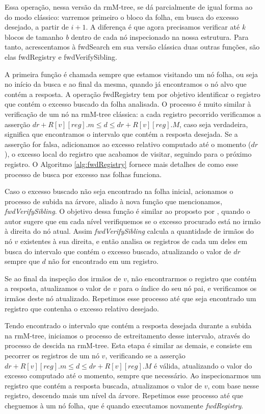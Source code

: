 Essa operação, nessa versão da rmM-tree, se dá parcialmente de igual forma ao do modo clássico: varremos primeiro o bloco da folha, em busca do excesso desejado, a partir de $i+1$.  A diferença é que agora precisamos verificar  até \textit{k} blocos de tamanho \textit{b} dentro de cada nó inspecionado na nossa estrutura. Para tanto, acrescentamos à fwdSearch em sua versão clássica duas outras funções, são elas fwdRegistry e fwdVerifySibling.

A primeira função é chamada sempre que estamos visitando um nó folha, ou seja no início da busca e ao final da mesma, quando já encontramos o nó alvo que contém a resposta.  A operação fwdRegistry tem por objetivo identificar o registro que contém o excesso buscado da folha analisada. O processo é muito similar à verificação de um nó na rmM-tree clássica: a cada registro pecorrido verificamos a asserção $dr + R[v][reg].m \leq d \leq dr + R[v][reg].M$, caso seja verdadeira, significa que encontramos o intervalo que contém a resposta desejada. Se a asserção for falsa, adicionamos ao excesso relativo computado até o momento ($dr$), o excesso local do registro que acabamos de visitar, seguindo para o próximo registro.  O Algoritmo \ref{alg:fwdRegistry} fornece mais detalhes de como esse processo de busca por excesso nas folhas funciona.

Caso o excesso buscado não seja encontrado na folha inicial, acionamos o processo de subida na árvore, aliado à nova função que mencionamos, \textit{fwdVerifySibling}. O objetivo dessa função é similar ao proposto por \citet{book-compact-data-structures}, quando o autor sugere que em cada nível verifiquemos se o excesso procurado está no irmão à direita do nó atual. Assim \textit{fwdVerifySibling} calcula a quantidade de irmãos do nó $v$ existentes à sua direita, e então analisa os registros de cada um deles em busca do intervalo que contém o excesso buscado, atualizando o valor de $dr$ sempre que $d$ não for encontrado em um registro.

Se ao final da inspeção dos irmãos de $v$, não encontrarmos o registro que contém a resposta, atualizamos o valor de $v$ para o índice do seu nó pai, e verificamos os irmãos deste nó atualizado. Repetimos esse processo até que seja encontrado um registro que contenha o excesso relativo desejado.

Tendo encontrado o intervalo que contém a resposta desejada durante a subida na rmM-tree, iniciamos  o processo de estreitamento desse intervalo, através do processo de descida na rmM-tree. Esta etapa é  similar as demais, e consiste em pecorrer os registros de um nó $v$, verificando se a asserção $dr + R[v][reg].m \leq d \leq dr + R[v][reg].M$ é válida, atualizando o valor do excesso computado até o momento, sempre que necessário. Ao inspecionarmos um registro que contém a resposta buscada,  atualizamos o valor de $v$, com base nesse registro, descendo mais um nível da árvore. Repetimos esse processo até que cheguemos à um nó folha, que é quando executamos novamente \textit{fwdRegistry}.

